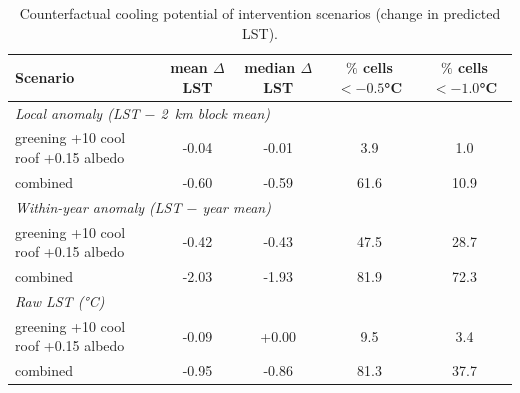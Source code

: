 \begin{table}[t]
\centering
\caption{Counterfactual cooling potential of intervention scenarios (change in predicted LST).}
\label{tab:scenarios}
\begin{tabular}{lcccc}
\toprule
Scenario & mean $\Delta$LST & median $\Delta$LST & $\%$ cells $<-0.5$°C & $\%$ cells $<-1.0$°C \\
\midrule
\multicolumn{5}{l}{\textit{Local anomaly (LST $-$ 2~km block mean)}} \\
\midrule
greening +10%
cool roof +0.15 albedo & -0.04 & -0.01 & 3.9 & 1.0 \\
combined & -0.60 & -0.59 & 61.6 & 10.9 \\
\midrule
\multicolumn{5}{l}{\textit{Within-year anomaly (LST $-$ year mean)}} \\
\midrule
greening +10%
cool roof +0.15 albedo & -0.42 & -0.43 & 47.5 & 28.7 \\
combined & -2.03 & -1.93 & 81.9 & 72.3 \\
\midrule
\multicolumn{5}{l}{\textit{Raw LST (°C)}} \\
\midrule
greening +10%
cool roof +0.15 albedo & -0.09 & +0.00 & 9.5 & 3.4 \\
combined & -0.95 & -0.86 & 81.3 & 37.7 \\
\bottomrule
\end{tabular}
\end{table}
